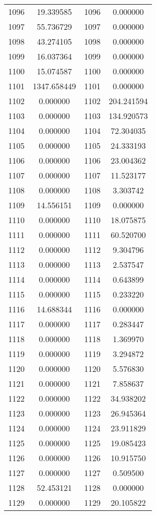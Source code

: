 \documentclass[12pt]{article}
\begin{document}
\begin{longtable}{@{}cccc@{}}
1096 & 19.339585 & 1096 & 0.000000 \\
1097 & 55.736729 & 1097 & 0.000000 \\
1098 & 43.274105 & 1098 & 0.000000 \\
1099 & 16.037364 & 1099 & 0.000000 \\
1100 & 15.074587 & 1100 & 0.000000 \\
1101 & 1347.658449 & 1101 & 0.000000 \\
1102 & 0.000000 & 1102 & 204.241594 \\
1103 & 0.000000 & 1103 & 134.920573 \\
1104 & 0.000000 & 1104 & 72.304035 \\
1105 & 0.000000 & 1105 & 24.333193 \\
1106 & 0.000000 & 1106 & 23.004362 \\
1107 & 0.000000 & 1107 & 11.523177 \\
1108 & 0.000000 & 1108 & 3.303742 \\
1109 & 14.556151 & 1109 & 0.000000 \\
1110 & 0.000000 & 1110 & 18.075875 \\
1111 & 0.000000 & 1111 & 60.520700 \\
1112 & 0.000000 & 1112 & 9.304796 \\
1113 & 0.000000 & 1113 & 2.537547 \\
1114 & 0.000000 & 1114 & 0.643899 \\
1115 & 0.000000 & 1115 & 0.233220 \\
1116 & 14.688344 & 1116 & 0.000000 \\
1117 & 0.000000 & 1117 & 0.283447 \\
1118 & 0.000000 & 1118 & 1.369970 \\
1119 & 0.000000 & 1119 & 3.294872 \\
1120 & 0.000000 & 1120 & 5.576830 \\
1121 & 0.000000 & 1121 & 7.858637 \\
1122 & 0.000000 & 1122 & 34.938202 \\
1123 & 0.000000 & 1123 & 26.945364 \\
1124 & 0.000000 & 1124 & 23.911829 \\
1125 & 0.000000 & 1125 & 19.085423 \\
1126 & 0.000000 & 1126 & 10.915750 \\
1127 & 0.000000 & 1127 & 0.509500 \\
1128 & 52.453121 & 1128 & 0.000000 \\
1129 & 0.000000 & 1129 & 20.105822 \\

\end{longtable}
\end{document}
